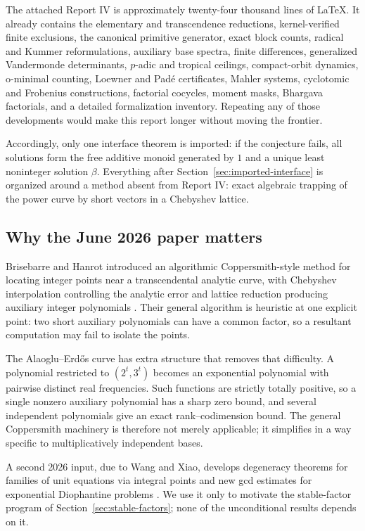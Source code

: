 \documentclass[11pt,oneside]{article}
\theoremstyle{definition}
\theoremstyle{remark}
\begin{document}
The attached Report IV is approximately twenty-four thousand lines of LaTeX.  It already
contains the elementary and transcendence reductions, kernel-verified finite exclusions, the
canonical primitive generator, exact block counts, radical and Kummer reformulations, auxiliary
base spectra, finite differences, generalized Vandermonde determinants, $p$-adic and tropical
ceilings, compact-orbit dynamics, o-minimal counting, Loewner and Pad\'e certificates, Mahler
systems, cyclotomic and Frobenius constructions, factorial cocycles, moment masks, Bhargava
factorials, and a detailed formalization inventory.  Repeating any of those developments would
make this report longer without moving the frontier.

Accordingly, only one interface theorem is imported: if the conjecture fails, all solutions
form the free additive monoid generated by $1$ and a unique least noninteger solution $\beta$.
Everything after Section~\ref{sec:imported-interface} is organized around a method absent from
Report IV: exact algebraic trapping of the power curve by short vectors in a Chebyshev lattice.

\subsection{Why the June 2026 paper matters}

Brisebarre and Hanrot introduced an algorithmic Coppersmith-style method for locating integer
points near a transcendental analytic curve, with Chebyshev interpolation controlling the
analytic error and lattice reduction producing auxiliary integer polynomials
\cite{BrisebarreHanrot2026}.  Their general algorithm is heuristic at one explicit point: two
short auxiliary polynomials can have a common factor, so a resultant computation may fail to
isolate the points.

The Alaoglu--Erd\H{o}s curve has extra structure that removes that difficulty.  A polynomial
restricted to $(2^t,3^t)$ becomes an exponential polynomial with pairwise distinct real
frequencies.  Such functions are strictly totally positive, so a single nonzero auxiliary
polynomial has a sharp zero bound, and several independent polynomials give an exact
rank--codimension bound.  The general Coppersmith machinery is therefore not merely applicable;
it simplifies in a way specific to multiplicatively independent bases.

A second 2026 input, due to Wang and Xiao, develops degeneracy theorems for families of unit
equations via integral points and new gcd estimates for exponential Diophantine problems
\cite{WangXiao2026}.  We use it only to motivate the stable-factor program of
Section~\ref{sec:stable-factors}; none of the unconditional results depends on it.
\end{document}
